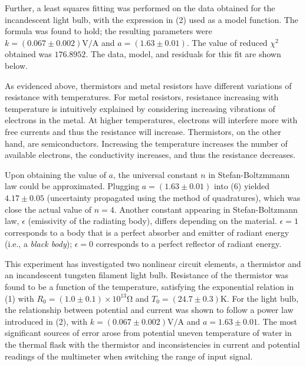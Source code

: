 \begin{paper}
	Further, a least squares fitting was performed on the data obtained for the incandescent light bulb, with the expression in (2) used as a model function. The formula was found to hold; the resulting parameters were \( k =  (0.067 \pm 0.002) \si{\volt\per\ampere} \) and \( a = (1.63 \pm 0.01) \). The value of reduced \( \chi ^ 2 \) obtained was \( 176.8952 \). The data, model, and residuals for this fit are shown below.

	 \vspace{1em}
	
	As evidenced above, thermistors and metal resistors have different variations of resistance with temperatures. For metal resistors, resistance increasing with temperature is intuitively explained by considering increasing vibrations of electrons in the metal. At higher temperatures, electrons will interfere more with free currents and thus the resistance will increase. Thermistors, on the other hand, are semiconductors. Increasing the temperature increases the number of available electrons, the conductivity increases, and thus the resistance decreases.
	
	Upon obtaining the value of \( a \), the universal constant \( n \) in Stefan-Boltzmmann law could be approximated. Plugging \( a = (1.63 \pm 0.01) \) into (6) yielded \( 4.17 \pm 0.05 \) (uncertainty propagated using the method  of quadratures), which was close the actual value of \( n = 4\). Another constant appearing in Stefan-Boltzmann law, \( \epsilon \) (emissivity of the radiating body), differs depending on the material. \( \epsilon = 1 \) corresponds to a body that is a perfect absorber and emitter of radiant energy (i.e., a \textit{black body}); \( \epsilon = 0 \) corresponds to a perfect reflector of radiant energy. 
	

		This experiment has investigated two nonlinear circuit elements, a thermistor and an incandescent tungsten filament light bulb. Resistance of the thermistor was found to be a function of the temperature, satisfying the exponential relation in (1) with \( R_0 = (1.0 \pm 0.1) \times 10^{13} \si{\ohm} \) and \( T_0 = (24.7 \pm 0.3) \si{\kelvin} \).  For the light bulb, the relationship between potential and current was shown to follow a power law introduced in (2), with \( k =  (0.067 \pm 0.002) \si{\volt\per\ampere} \) and \( a = 1.63 \pm 0.01 \). The most significant sources of error arose from potential uneven temperature of water in the thermal flask with the thermistor and inconsistencies in current and potential readings of the multimeter when switching the range of input signal. 
		

\end{paper}
